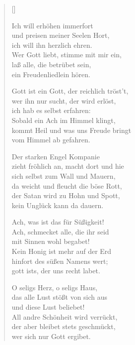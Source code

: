 \begin{multicols}{2}
\settowidth{\versewidth}{Gott ist ein Gott, der reichlich tröst't,}
\begin{verse}[\versewidth]

 Ich will erhöhen immerfort\\
und preisen meiner Seelen Hort,\\
ich will ihn herzlich ehren.\\
Wer Gott liebt, stimme mit mir ein,\\
laß alle, die betrübet sein,\\
ein Freudenliedlein hören.

 Gott ist ein Gott, der reichlich tröst't,\\
wer ihn nur sucht, der wird erlöst,\\
ich hab es selbst erfahren:\\
Sobald ein Ach im Himmel klingt,\\
kommt Heil und was uns Freude bringt\\
vom Himmel ab gefahren.

 Der starken Engel Kompanie\\
zieht fröhlich an, macht dort und hie\\
sich selbst zum Wall und Mauern,\\
da weicht und fleucht die böse Rott,\\
der Satan wird zu Hohn und Spott,\\
kein Unglück kann da dauern.

 Ach, was ist das für Süßigkeit!\\
Ach, schmecket alle, die ihr seid\\
mit Sinnen wohl begabet!\\
Kein Honig ist mehr auf der Erd\\
hinfort des süßen Namens wert;\\
gott ists, der uns recht labet.

 O seligs Herz, o seligs Haus,\\
das alle Lust stößt von sich aus\\
und diese Lust beliebet!\\
All andre Schönheit wird verrückt,\\
der aber bleibet stets geschmückt,\\
wer sich nur Gott ergibet.


\end{verse}
\end{multicols}
